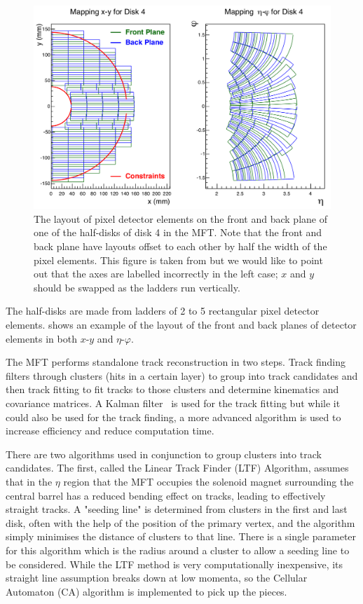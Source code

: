 \begin{figure}[h]
    \begin{center}
        \includegraphics[width=.8\textwidth]{Figs/MFT_Disk4_mapping.png}
        \caption{The layout of pixel detector elements on the front and back plane of one of the half-disks of disk 4 in the MFT. Note that the front and back plane have layouts offset to each other by half the width of the pixel elements. This figure is taken from \cite[fig.~6.1]{MFT_TDR} but we would like to point out that the axes are labelled incorrectly in the left case; $x$ and $y$ should be swapped as the ladders run vertically.}
        \label{fig:MFT_Disk4_mapping}
    \end{center}
\end{figure}

The half-disks are made from ladders of 2 to 5 rectangular pixel detector elements.  shows an example of the layout of the front and back planes of detector elements in both $x$-$y$ and $\eta$-$\varphi$. 

The MFT performs standalone track reconstruction in two steps. Track finding filters through clusters (hits in a certain layer) to group into track candidates and then track fitting to fit tracks to those clusters and determine kinematics and covariance matrices. A Kalman filter~\cite{Kalman} is used for the track fitting but while it could also be used for the track finding, a more advanced algorithm is used to increase efficiency and reduce computation time. 

There are two algorithms used in conjunction to group clusters into track candidates. The first, called the Linear Track Finder (LTF) Algorithm, assumes that in the $\eta$ region that the MFT occupies the solenoid magnet surrounding the central barrel has a reduced bending effect on tracks, leading to effectively straight tracks. A "seeding line" is determined from clusters in the first and last disk, often with the help of the position of the primary vertex, and the algorithm simply minimises the distance of clusters to that line. There is a single parameter for this algorithm which is the radius around a cluster to allow a seeding line to be considered. While the LTF method is very computationally inexpensive, its straight line assumption breaks down at low momenta, so the Cellular Automaton (CA) algorithm is implemented to pick up the pieces.

